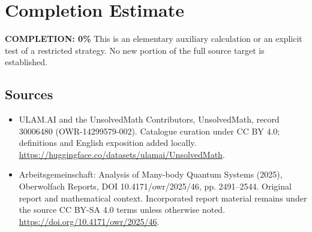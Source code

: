 \documentclass[11pt]{article}
\begin{document}
\section{Completion Estimate}
\noindent\textbf{COMPLETION: 0\%}
This is an elementary auxiliary calculation or an explicit test of a restricted strategy. No new portion of the full source target is established.

\subsection{Sources}
\begin{itemize}
\item[\hypertarget{source:30006480:1}{S1}] ULAM.AI and the UnsolvedMath Contributors, UnsolvedMath, record 30006480 (OWR-14299579-002). Catalogue curation under CC BY 4.0; definitions and English exposition added locally.
\url{https://huggingface.co/datasets/ulamai/UnsolvedMath}.
\item[\hypertarget{source:30006480:2}{S2}] Arbeitsgemeinschaft: Analysis of Many-body Quantum Systems (2025), Oberwolfach Reports, DOI 10.4171/owr/2025/46, pp. 2491--2544. Original report and mathematical context. Incorporated report material remains under the source CC BY-SA 4.0 terms unless otherwise noted.
\url{https://doi.org/10.4171/owr/2025/46}.
\end{itemize}
\label{end:30006480}
\end{document}
